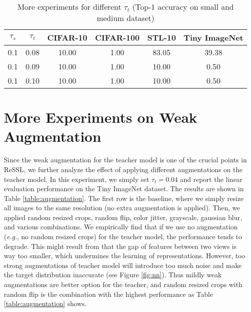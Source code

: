 \documentclass{article}
\newcommand{\<}{\left\langle}
\renewcommand{\>}{\right\rangle}
\newcommand{\eg}{{\emph{e.g.}}}
\begin{document}
\renewcommand\arraystretch{1.12}
\begin{table}[h]
 \centering
 \setlength\tabcolsep{10pt}
 \small
 \caption{More experiments for different $\tau_t$ (Top-1 accuracy on small and medium dataset)}
 \vspace{-5pt}
 \label{table:tau_t}
\begin{tabular}{c c c c c c} 
\toprule 
$\tau_s$ & $\tau_t$ & CIFAR-10 & CIFAR-100 & STL-10 & Tiny ImageNet \\ \hline
 0.1  & 0.08  & 10.00 & 1.00 & 83.05 & 39.38 \\
 0.1  & 0.09  & 10.00 & 1.00 & 10.00 & 0.50 \\
 0.1  & 0.10  & 10.00 & 1.00 & 10.00 & 0.50 \\
\toprule 
\end{tabular}
\end{table}


\section{More Experiments on Weak Augmentation}
Since the weak augmentation for the teacher model is one of the crucial points in ReSSL, we further analyze the effect of applying different augmentations on the teacher model. In this experiment, we simply set $\tau_t = 0.04$ and report the linear evaluation performance on the Tiny ImageNet dataset.  The results are shown in Table \ref{table:augmentation}. The first row is the baseline, where we simply resize all images to the same resolution (no extra augmentation is applied). Then, we applied random resized crops, random flip, color jitter, grayscale, gaussian blur, and various combinations. We empirically find that if we use no augmentation (\eg, no random resized crops) for the teacher model, the performance tends to degrade. This might result from that the gap of features between two views is way too smaller, which undermines the learning of representations. However, too strong augmentations of teacher model will introduce too much noise and make the target distribution inaccurate (see Figure \ref{fig:nn}). Thus mildly weak augmentations are better option for the teacher, and random resized crops with random flip is the combination with the highest performance as Table \ref{table:augmentation} shows.
\end{document}
